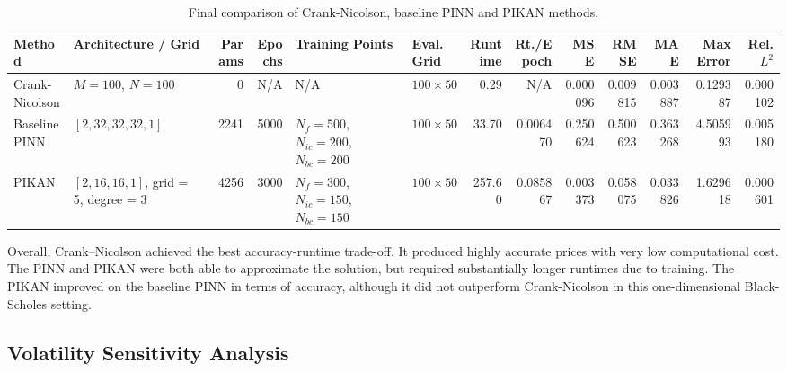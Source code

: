 \documentclass[11pt,a4paper]{article}
\begin{document}
\begin{table}[htbp]
\centering
\scriptsize
\begin{adjustbox}{width=\textwidth}
\begin{tabular}{l l r r l l r r r r r r r}
\toprule
Method & Architecture / Grid & Params & Epochs & Training Points & Eval. Grid & Runtime & Rt./Epoch & MSE & RMSE & MAE & Max Error & Rel. $L^2$ \\
\midrule
Crank-Nicolson & $M=100$, $N=100$ & 0 & N/A & N/A & $100 \times 50$ & 0.29 & N/A & 0.000096 & 0.009815 & 0.003887 & 0.129387 & 0.000102 \\
Baseline PINN & $[2,32,32,32,1]$ & 2241 & 5000 & $N_f=500$, $N_{ic}=200$, $N_{bc}=200$ & $100 \times 50$ & 33.70 & 0.006470 & 0.250624 & 0.500623 & 0.363268 & 4.505993 & 0.005180 \\
PIKAN & \makecell[l]{$[2,16,16,1]$,\\ grid = 5, degree = 3} & 4256 & 3000 & $N_f=300$, $N_{ic}=150$, $N_{bc}=150$ & $100 \times 50$ & 257.60 & 0.085867 & 0.003373 & 0.058075 & 0.033826 & 1.629618 & 0.000601 \\
\bottomrule
\end{tabular}
\end{adjustbox}
\caption{Final comparison of Crank-Nicolson, baseline PINN and PIKAN methods.}
\label{tab:7}
\end{table}

Overall, Crank--Nicolson achieved the best accuracy-runtime trade-off. It produced highly accurate prices with very low computational cost. The PINN and PIKAN were both able to approximate the solution, but required substantially longer runtimes due to training. The PIKAN improved on the baseline PINN in terms of accuracy, although it did not outperform Crank-Nicolson in this one-dimensional Black-Scholes setting.

\subsection{Volatility Sensitivity Analysis}
\end{document}
